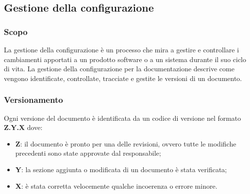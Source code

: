     \subsection{Gestione della configurazione}
        \subsubsection{Scopo}
        La gestione della configurazione è un processo che mira a gestire e controllare i cambiamenti apportati
        a un prodotto software o a un sistema durante il suo ciclo di vita. La gestione della configurazione per
        la documentazione descrive come vengono identificate, controllate, tracciate e gestite le versioni di un
        documento.
        \subsubsection{Versionamento}
        Ogni versione del documento è identificata da un codice di versione nel formato \textbf{Z.Y.X} dove:
        \begin{itemize}
            \item \textbf{Z}: il documento è pronto per una delle revisioni, ovvero tutte le modifiche precedenti sono state approvate dal responsabile;
            \item \textbf{Y}: la sezione aggiunta o modificata di un documento è stata verificata;
            \item \textbf{X}: è stata corretta velocemente qualche incoerenza o errore minore.
        \end{itemize}
